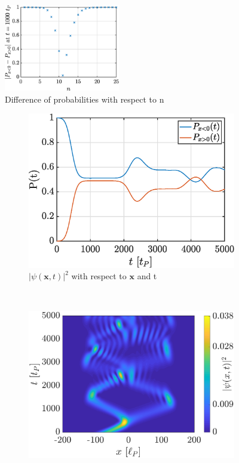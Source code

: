 \documentclass[a4paper,12pt,twoside]{article}
\newcommand{\mbf}[1]{\mathbf{#1}} %
\begin{document}
\begin{figure}[h]
  \centering
  \includegraphics[width=0.45\textwidth]{graphs/iii_findn_n.eps}
  \caption{Difference of probabilities with respect to n}
  \label{fig:iii_findn_n}
\end{figure}


\begin{figure}[h]
  \centering
  \begin{subfigure}[t]{0.45\textwidth}
    \includegraphics[width=\textwidth]{graphs/iii_findn_prob.eps}
    \caption{$|\psi(\mbf{x}, t)|^2$ with respect to $\mbf{x}$ and t}
    \label{fig:iii_findn_prob}
  \end{subfigure}
  ~
  \begin{subfigure}[t]{0.45\textwidth}
    \includegraphics[width=\textwidth]{graphs/iii_findn_evo.eps}

\end{subfigure}
\end{figure}
\end{document}
